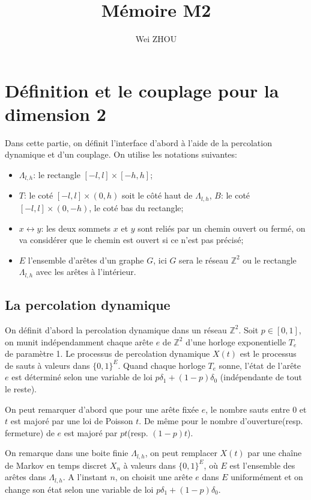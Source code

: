 \documentclass[titlepage,a4paper,11pt]{article}
\title{Mémoire M2}
\author{Wei ZHOU}
\begin{document}
\maketitle

\section{Définition et le couplage pour la dimension 2}
Dans cette partie, on définit l'interface d'abord à l'aide de la percolation dynamique et d'un couplage. On utilise les notations suivantes:
\begin{itemize}
\item $\Lambda_{l,h}$: le rectangle $[-l,l]\times[-h,h]$;
\item $T$: le coté $[-l,l]\times(0,h)$ soit le côté haut de $\Lambda_{l,h}$, $B$: le coté $[-l,l]\times(0,-h)$, le coté bas du rectangle;
\item $x\leftrightarrow y$: les deux sommets $x$ et $y$ sont reliés par un chemin ouvert ou fermé, on va considérer que le chemin est ouvert si ce n'est pas précisé;
\item $E$ l'ensemble d'arêtes d'un graphe $G$, ici $G$ sera le réseau $\mathbb{Z}^2$ ou le rectangle $\Lambda_{l,h}$ avec les arêtes à l'intérieur.
\end{itemize}
\subsection{La percolation dynamique}
On définit d'abord la percolation dynamique dans un réseau $\mathbb{Z}^2$. 
Soit $p\in [0,1]$, on munit indépendamment chaque arête $e$ de $\mathbb{Z}^2$ d'une horloge exponentielle $T_e$ de paramètre 1. Le processus de percolation dynamique $X(t)$ est le processus de sauts à valeurs dans $\{0,1\}^E$. Quand chaque horloge $T_e$ sonne, l'état de l'arête $e$ est déterminé selon une variable de loi $p\delta_1+(1-p)\delta_0$ (indépendante de tout le reste). 

On peut remarquer d'abord que pour une arête fixée $e$, le nombre sauts entre $0$ et $t$ est majoré par une loi de Poisson $t$. De même pour le nombre d'ouverture(resp. fermeture) de $e$ est majoré par $pt$(resp. $(1-p)t$).

On remarque dans une boite finie $\Lambda_{l,h}$, on peut remplacer $X(t)$ par une chaîne de Markov en temps discret $X_n$ à valeurs dans $\{0,1\}^E$, où $E$ est l'ensemble des arêtes dans $\Lambda_{l,h}$. A l'instant $n$, on choisit une arête $e$ dans $E$ uniformément et on change son état selon une variable de loi $p\delta_1 +(1-p)\delta_0$.
\end{document}
